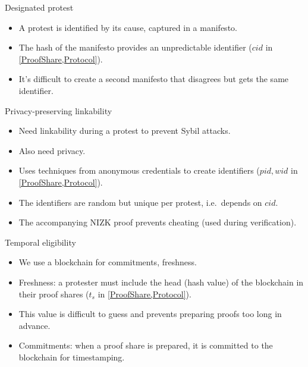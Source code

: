 \begin{columns}[t]
\begin{column}{0.32\linewidth}
    \begin{whiteblock}{Designated protest}
      \begin{itemize}
        \item A protest is identified by its cause, captured in a 
          manifesto.
        \item The hash of the manifesto provides an unpredictable identifier 
          (\(cid\) in \cref{ProofShare,Protocol}).
        \item It's difficult to create a second manifesto that disagrees but 
          gets the same identifier.
      \end{itemize}
    \end{whiteblock}

    \begin{whiteblock}{Privacy-preserving linkability}
      \begin{itemize}
        \item Need linkability during a protest to prevent Sybil attacks.
        \item Also need privacy.
        \item Uses techniques from anonymous credentials to create identifiers 
          (\(pid, wid\) in \cref{ProofShare,Protocol}).
        \item The identifiers are random but unique per protest, i.e.\ depends 
          on \(cid\).
        \item The accompanying \ac{NIZK} proof prevents cheating (used during 
          verification).
      \end{itemize}
    \end{whiteblock}

    \begin{whiteblock}{Temporal eligibility}
      \begin{itemize}
        \item We use a blockchain for commitments, freshness.
        \item Freshness: a protester must include the head (hash value) of the 
          blockchain in their proof shares (\(t_s\) in 
          \cref{ProofShare,Protocol}).
        \item This value is difficult to guess and prevents preparing proofs too 
          long in advance.
        \item Commitments: when a proof share is prepared, it is committed to 
          the blockchain for timestamping.
      \end{itemize}
    \end{whiteblock}


\end{column}
\end{columns}
